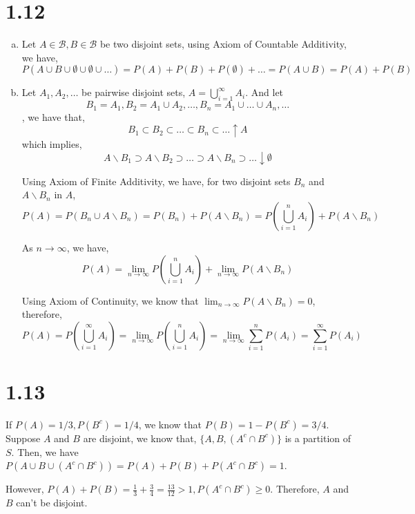 \documentclass[letterpaper]{article}
\begin{document}
    \section*{1.12}
    \begin{enumerate}[(a)]
    \item Let $A \in \mathcal{B}, B \in \mathcal{B}$ be two disjoint sets, using Axiom of Countable
    Additivity, we have,
    \[
    P(A \cup B \cup \emptyset \cup \emptyset \cup \dots) = P(A) + P(B) + P(\emptyset) + \dots = P(A \cup B) = P(A) + P(B)
    \]
    \item Let $A_1, A_2, \dots$ be pairwise disjoint sets, $A = \bigcup_{i=1}^{\infty} A_i$. And let 
    \[
    B_1 = A_1, B_2 = A_1 \cup A_2, \dots, B_n = A_1 \cup \dots \cup A_n, \dots
    \], we have that,
    \[
    B_1 \subset B_2 \subset \dots \subset B_n \subset \dots \uparrow A
    \]
    which implies,
    \[
    A \backslash B_1 \supset A \backslash B_2 \supset \dots \supset A
    \backslash B_n \supset \dots \downarrow \emptyset
    \]

    Using Axiom of Finite Additivity, we have, for two disjoint sets $B_n$ and
    $A \backslash B_n$ in $A$,
    \[
    P(A) = P\left(B_n \cup A \backslash B_n\right) = P(B_n) + P(A \backslash
    B_n) = P(\bigcup_{i=1}^n A_i) + P(A \backslash B_n)
    \]

    As $n \to \infty$, we have,
    \[
    P(A) = \lim_{n \to \infty} P(\bigcup_{i=1}^n A_i) + \lim_{n \to \infty} P(A
    \backslash B_n)
    \]

    Using Axiom of Continuity, we know that $\lim_{n \to \infty} P(A \backslash B_n) = 0$, therefore,
    \[
    P(A) = P(\bigcup_{i=1}^{\infty} A_i) = \lim_{n \to \infty} P(\bigcup_{i=1}^n A_i) = \lim_{n \to \infty} \sum_{i=1}^n P(A_i) 
    = \sum_{i=1}^{\infty} P(A_i)
    \]

    \end{enumerate}
    \section*{1.13}
    If $P(A) = 1/3, P(B^c) = 1/4$, we know that $P(B) = 1 - P(B^c) = 3/4$. 
    Suppose $A$ and $B$ are disjoint, we know that, $\{A, B, (A^c \cap B^c)\}$ is a partition of $S$.
    Then, we have $P\left(A \cup B \cup (A^c \cap B^c) \right) = P(A) + P(B) + P(A^c \cap B^c) = 1$.

    However, $P(A) + P(B) = \frac{1}{3} + \frac{3}{4} = \frac{13}{12} > 1, P(A^c \cap B^c) \geq 0$. 
    Therefore, $A$ and $B$ can't be disjoint.
\end{document}
